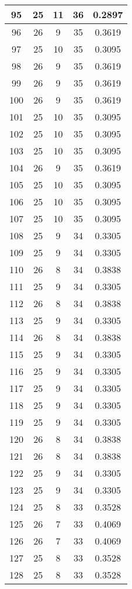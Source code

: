 \documentclass[letterpaper, 12pt]{article}
\begin{document}
\begin{longtable}{|c|c|c|c|c|}
\hline
95 & 25 & 11 & 36 & 0.2897 \\
\hline
96 & 26 & 9 & 35 & 0.3619 \\
\hline
97 & 25 & 10 & 35 & 0.3095 \\
\hline
98 & 26 & 9 & 35 & 0.3619 \\
\hline
99 & 26 & 9 & 35 & 0.3619 \\
\hline
100 & 26 & 9 & 35 & 0.3619 \\
\hline
101 & 25 & 10 & 35 & 0.3095 \\
\hline
102 & 25 & 10 & 35 & 0.3095 \\
\hline
103 & 25 & 10 & 35 & 0.3095 \\
\hline
104 & 26 & 9 & 35 & 0.3619 \\
\hline
105 & 25 & 10 & 35 & 0.3095 \\
\hline
106 & 25 & 10 & 35 & 0.3095 \\
\hline
107 & 25 & 10 & 35 & 0.3095 \\
\hline
108 & 25 & 9 & 34 & 0.3305 \\
\hline
109 & 25 & 9 & 34 & 0.3305 \\
\hline
110 & 26 & 8 & 34 & 0.3838 \\
\hline
111 & 25 & 9 & 34 & 0.3305 \\
\hline
112 & 26 & 8 & 34 & 0.3838 \\
\hline
113 & 25 & 9 & 34 & 0.3305 \\
\hline
114 & 26 & 8 & 34 & 0.3838 \\
\hline
115 & 25 & 9 & 34 & 0.3305 \\
\hline
116 & 25 & 9 & 34 & 0.3305 \\
\hline
117 & 25 & 9 & 34 & 0.3305 \\
\hline
118 & 25 & 9 & 34 & 0.3305 \\
\hline
119 & 25 & 9 & 34 & 0.3305 \\
\hline
120 & 26 & 8 & 34 & 0.3838 \\
\hline
121 & 26 & 8 & 34 & 0.3838 \\
\hline
122 & 25 & 9 & 34 & 0.3305 \\
\hline
123 & 25 & 9 & 34 & 0.3305 \\
\hline
124 & 25 & 8 & 33 & 0.3528 \\
\hline
125 & 26 & 7 & 33 & 0.4069 \\
\hline
126 & 26 & 7 & 33 & 0.4069 \\
\hline
127 & 25 & 8 & 33 & 0.3528 \\
\hline
128 & 25 & 8 & 33 & 0.3528 \\

\end{longtable}
\end{document}
